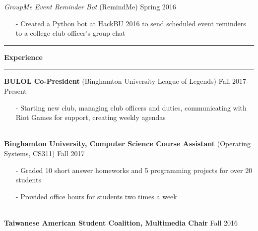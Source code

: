 \documentclass[10pt]{article}
\newcommand{\Hrule}{\vspace{0.7mm}\hrule\vspace{0.7mm}}
\newcommand{\Indent}{\indent\indent}
\begin{document}
            \Indent \small\textit{GroupMe Event Reminder Bot}\small{ (RemindMe)} \hfill \small{Spring 2016}\indent\vspace{0.5mm}\\
                \Indent\begin{minipage}{\dimexpr\textwidth-6cm}
                    \begin{itemize}[noitemsep, topsep=0pt]
                        \item[-] Created a Python bot at HackBU 2016 to send scheduled event reminders to a college club officer's group chat
                    \end{itemize}\vspace{0mm}
                \end{minipage}
\Hrule\noindent\textbf{\normalsize Experience}\Hrule
    \indent\small{\textbf{BULOL Co-President} (Binghamton University League of Legends)} \hfill \small{Fall 2017-Present}\indent\vspace{0.5mm}\\
        \indent\begin{minipage}{\dimexpr\textwidth-6cm}
            \begin{itemize}[noitemsep, topsep=0pt]
                \item[-] Starting new club, managing club officers and duties, communicating with Riot Games for support, creating weekly agendas
            \end{itemize}\vspace{0mm}
        \end{minipage}\\
    \indent\small{\textbf{Binghamton University, Computer Science Course Assistant} (Operating Systems, CS311)} \hfill \small{Fall 2017}\indent\vspace{0.5mm}\\
        \indent\begin{minipage}{\dimexpr\textwidth-6cm}
            \begin{itemize}[noitemsep, topsep=0pt]
                \item[-] Graded 10 short answer homeworks and 5 programming projects for over 20 students
                \item[-] Provided office hours for students two times a week
            \end{itemize}\vspace{0mm}
        \end{minipage}\\
    \indent\small{\textbf{Taiwanese American Student Coalition, Multimedia Chair}} \hfill \small{Fall 2016}\indent\vspace{0.5mm}
\end{document}
